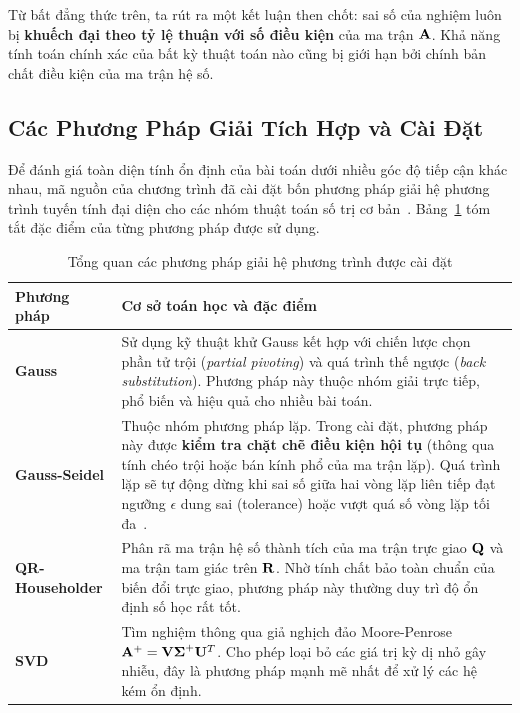 \begin{note}
Từ bất đẳng thức trên, ta rút ra một kết luận then chốt: sai số của nghiệm luôn bị \textbf{khuếch đại theo tỷ lệ thuận với số điều kiện} của ma trận $\mathbf{A}$. Khả năng tính toán chính xác của bất kỳ thuật toán nào cũng bị giới hạn bởi chính bản chất điều kiện của ma trận hệ số.
\end{note}

\subsection{Các Phương Pháp Giải Tích Hợp và Cài Đặt}

Để đánh giá toàn diện tính ổn định của bài toán dưới nhiều góc độ tiếp cận khác nhau, mã nguồn của chương trình đã cài đặt bốn phương pháp giải hệ phương trình tuyến tính đại diện cho các nhóm thuật toán số trị cơ bản~\cite{golub2013, strang2023}. Bảng~\ref{tab:methods_overview} tóm tắt đặc điểm của từng phương pháp được sử dụng.

\begin{table}[H]
\centering
\caption{Tổng quan các phương pháp giải hệ phương trình được cài đặt}
\label{tab:methods_overview}
\renewcommand{\arraystretch}{1.4}
\setlength{\tabcolsep}{10pt}
\begin{tabular}{lp{10.5cm}}
\toprule
\textbf{Phương pháp} & \textbf{Cơ sở toán học và đặc điểm} \\
\midrule
\textbf{Gauss} & Sử dụng kỹ thuật khử Gauss kết hợp với chiến lược chọn phần tử trội (\textit{partial pivoting}) và quá trình thế ngược (\textit{back substitution}). Phương pháp này thuộc nhóm giải trực tiếp, phổ biến và hiệu quả cho nhiều bài toán. \\
\textbf{Gauss-Seidel} & Thuộc nhóm phương pháp lặp. Trong cài đặt, phương pháp này được \textbf{kiểm tra chặt chẽ điều kiện hội tụ} (thông qua tính chéo trội hoặc bán kính phổ của ma trận lặp). Quá trình lặp sẽ tự động dừng khi sai số giữa hai vòng lặp liên tiếp đạt ngưỡng $\epsilon$ dung sai (tolerance) hoặc vượt quá số vòng lặp tối đa~\cite{saad2003, burden2015}. \\
\textbf{QR-Householder} & Phân rã ma trận hệ số thành tích của ma trận trực giao $\mathbf{Q}$ và ma trận tam giác trên $\mathbf{R}$. Nhờ tính chất bảo toàn chuẩn của biến đổi trực giao, phương pháp này thường duy trì độ ổn định số học rất tốt. \\
\textbf{SVD} & Tìm nghiệm thông qua giả nghịch đảo Moore-Penrose $\mathbf{A}^+ = \mathbf{V} \boldsymbol{\Sigma}^+ \mathbf{U}^T$. Cho phép loại bỏ các giá trị kỳ dị nhỏ gây nhiễu, đây là phương pháp mạnh mẽ nhất để xử lý các hệ kém ổn định. \\
\bottomrule
\end{tabular}
\end{table}

